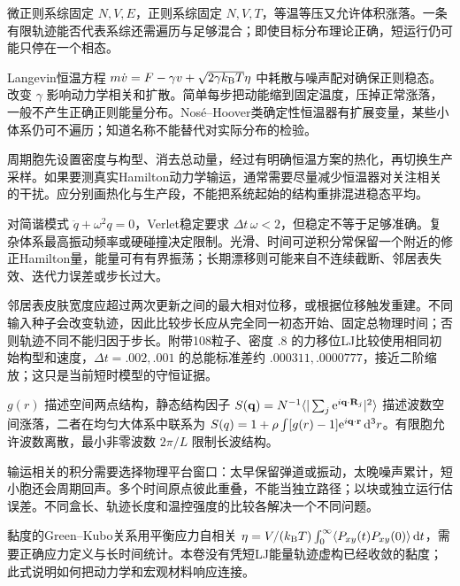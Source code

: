 微正则系综固定 $N,V,E$，正则系综固定 $N,V,T$，等温等压又允许体积涨落。一条有限轨迹能否代表系综还需遍历与足够混合；即使目标分布理论正确，短运行仍可能只停在一个相态。

Langevin恒温方程 $m\dot v=F-\gamma v+\sqrt{2\gamma k_{\mathrm B} T}\eta$ 中耗散与噪声配对确保正则稳态。改变 $\gamma$ 影响动力学相关和扩散。简单每步把动能缩到固定温度，压掉正常涨落，一般不产生正确正则能量分布。Nos\'e--Hoover类确定性恒温器有扩展变量，某些小体系仍可不遍历；知道名称不能替代对实际分布的检验。

周期胞先设置密度与构型、消去总动量，经过有明确恒温方案的热化，再切换生产采样。如果要测真实Hamilton动力学输运，通常需要尽量减少恒温器对关注相关的干扰。应分别画热化与生产段，不能把系统起始的结构重排混进稳态平均。

对简谐模式 $\ddot q+\omega^2q=0$，Verlet稳定要求 $\Delta t\,\omega<2$，但稳定不等于足够准确。复杂体系最高振动频率或硬碰撞决定限制。光滑、时间可逆积分常保留一个附近的修正Hamilton量，能量可有有界振荡；长期漂移则可能来自不连续截断、邻居表失效、迭代力误差或步长过大。

邻居表皮肤宽度应超过两次更新之间的最大相对位移，或根据位移触发重建。不同输入种子会改变轨迹，因此比较步长应从完全同一初态开始、固定总物理时间；否则轨迹不同不能归因于步长。附带108粒子、密度 $.8$ 的力移位LJ比较使用相同初始构型和速度，$\Delta t=.002,.001$ 的总能标准差约 $.000311,.0000777$，接近二阶缩放；这只是当前短时模型的守恒证据。

$g(r)$ 描述空间两点结构，静态结构因子 $S(\mathbf q)=N^{-1}\langle |\sum_j\mathrm e^{i\mathbf q\cdot\mathbf R_j}|^2\rangle$ 描述波数空间涨落，二者在均匀大体系中联系为 $S(q)=1+\rho\int[g(r)-1]\mathrm e^{i\mathbf q\cdot\mathbf r}\,\mathrm d^3r$。有限胞允许波数离散，最小非零波数 $2\pi/L$ 限制长波结构。

输运相关的积分需要选择物理平台窗口：太早保留弹道或振动，太晚噪声累计，短小胞还会周期回声。多个时间原点彼此重叠，不能当独立路径；以块或独立运行估误差。不同盒长、轨迹长度和温控强度的比较各解决一个不同问题。

黏度的Green--Kubo关系用平衡应力自相关 $\eta=V/(k_{\mathrm B} T)\int_0^\infty\langle P_{xy}(t)P_{xy}(0)\rangle\,\mathrm d t$，需要正确应力定义与长时间统计。本卷没有凭短LJ能量轨迹虚构已经收敛的黏度；此式说明如何把动力学和宏观材料响应连接。
